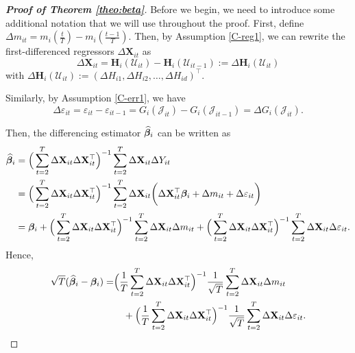 \documentclass[a4paper,12pt]{article}
\begin{document}
\begin{proof}[\textnormal{\textbf{Proof of Theorem \ref{theo:beta}}}]


Before we begin, we need to introduce some additional notation that we will use throughout the proof. First, define $\Delta m_{it} = m_i \left( \frac{t}{T} \right) - m_i \left(\frac{t-1}{T}\right)$. Then, by Assumption \ref{C-reg1}, we can rewrite the first-differenced regressors $\Delta  \mathbf{X}_{it}$ as
\[ \Delta \mathbf{X}_{it} =\mathbf{H}_i(\mathcal{U}_{it}) - \mathbf{H}_i(\mathcal{U}_{it-1}) := \Delta \mathbf{H}_i(\mathcal{U}_{it}) \]
with $\Delta \mathbf{H}_i(\mathcal{U}_{it}) := (\Delta H_{i1}, \Delta H_{i2}, \ldots, \Delta H_{id})^\top$.

Similarly, by Assumption \ref{C-err1}, we have
\[\Delta \varepsilon_{it} = \varepsilon_{it} - \varepsilon_{it-1} = G_i(\mathcal{J}_{it}) - G_i(\mathcal{J}_{it-1}) = \Delta G_i(\mathcal{J}_{it}).
\]

Then, the differencing estimator $\widehat{\bm{\beta}}_i$ can be written as
\begin{align*}
\widehat{\bm{\beta}}_i &= \Big( \sum_{t=2}^T \Delta \mathbf{X}_{it} \Delta \mathbf{X}_{it}^\top \Big)^{-1} \sum_{t=2}^T \Delta \mathbf{X}_{it} \Delta Y_{it} \\
& =  \Big( \sum_{t=2}^T \Delta \mathbf{X}_{it} \Delta \mathbf{X}_{it}^\top \Big)^{-1} \sum_{t=2}^T \Delta \mathbf{X}_{it} \bigg(\Delta \mathbf{X}_{it}^\top \bm{\beta}_i +  \Delta m_{it}+ \Delta \varepsilon_{it} \bigg) \\
&= \bm{\beta}_i +   \Big( \sum_{t=2}^T \Delta \mathbf{X}_{it} \Delta \mathbf{X}_{it}^\top \Big)^{-1} \sum_{t=2}^T \Delta \mathbf{X}_{it} \Delta m_{it} +  \Big( \sum_{t=2}^T \Delta \mathbf{X}_{it} \Delta \mathbf{X}_{it}^\top \Big)^{-1} \sum_{t=2}^T \Delta \mathbf{X}_{it} \Delta \varepsilon_{it}. 
\end{align*}
Hence,
\begin{align}\label{theo:beta:proof1}
\begin{split}
 \sqrt{T}( \widehat{\bm{\beta}}_i - \bm{\beta}_i) = &\Big( \frac{1}{T}\sum_{t=2}^T \Delta \mathbf{X}_{it} \Delta \mathbf{X}_{it}^\top \Big)^{-1} \frac{1}{\sqrt{T}}\sum_{t=2}^T \Delta \mathbf{X}_{it} \Delta m_{it} \\
&\quad+  \Big(\frac{1}{T} \sum_{t=2}^T \Delta \mathbf{X}_{it} \Delta \mathbf{X}_{it}^\top \Big)^{-1}\frac{1}{\sqrt{T}} \sum_{t=2}^T \Delta \mathbf{X}_{it} \Delta \varepsilon_{it}.
\end{split}
\end{align}


\end{proof}
\end{document}
